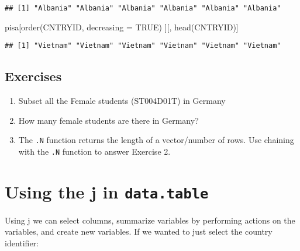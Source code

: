 \documentclass[
]{book}
\newenvironment{Shaded}{\begin{snugshade}}{\end{snugshade}}
\newcommand{\AttributeTok}[1]{\textcolor[rgb]{0.77,0.63,0.00}{#1}}
\newcommand{\ConstantTok}[1]{\textcolor[rgb]{0.00,0.00,0.00}{#1}}
\newcommand{\FunctionTok}[1]{\textcolor[rgb]{0.00,0.00,0.00}{#1}}
\newcommand{\NormalTok}[1]{#1}
\newcommand{\SpecialCharTok}[1]{\textcolor[rgb]{0.00,0.00,0.00}{#1}}
\providecommand{\tightlist}{%
  \setlength{\itemsep}{0pt}\setlength{\parskip}{0pt}}
\begin{document}
\begin{Shaded}
\end{Shaded}

\begin{verbatim}
## [1] "Albania" "Albania" "Albania" "Albania" "Albania" "Albania"
\end{verbatim}

\begin{Shaded}
\begin{Highlighting}[]
\NormalTok{pisa[}\FunctionTok{order}\NormalTok{(CNTRYID, }\AttributeTok{decreasing =} \ConstantTok{TRUE}\NormalTok{)}
\NormalTok{     ][,}
       \FunctionTok{head}\NormalTok{(CNTRYID)]}
\end{Highlighting}
\end{Shaded}

\begin{verbatim}
## [1] "Vietnam" "Vietnam" "Vietnam" "Vietnam" "Vietnam" "Vietnam"
\end{verbatim}

\hypertarget{exercises-1}{%
\subsection{Exercises}\label{exercises-1}}

\begin{enumerate}
\def\labelenumi{\arabic{enumi}.}
\tightlist
\item
  Subset all the Female students (ST004D01T) in Germany
\item
  How many female students are there in Germany?
\item
  The \texttt{.N} function returns the length of a vector/number of rows. Use chaining with the \texttt{.N} function to answer Exercise 2.
\end{enumerate}

\hypertarget{using-the-j-in-data.table}{%
\section{\texorpdfstring{Using the j in \texttt{data.table}}{Using the j in data.table}}\label{using-the-j-in-data.table}}

Using j we can select columns, summarize variables by performing actions on the variables, and create new variables. If we wanted to just select the country identifier:
\end{document}
